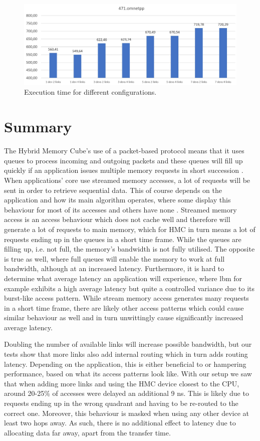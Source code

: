\begin{figure}[!ht]
    \centering
    \includegraphics[width=1.0\linewidth]{figure/471-exectime.jpg}
    \caption{Execution time for different configurations.}
    \label{Memory-access-471-exectime}
\end{figure}

\section{Summary}
The Hybrid Memory Cube's use of a packet-based protocol means that it uses queues to process incoming and outgoing packets and these queues will fill up quickly if an application issues multiple memory requests in short succession \cite{8366939}. When applications' core use streamed memory accesses, a lot of requests will be sent in order to retrieve sequential data. This of course depends on the application and how its main algorithm operates, where some display this behaviour for most of its accesses and others have none \cite{10.1145/3307650.3322229}. Streamed memory access is an access behaviour which does not cache well and therefore will generate a lot of requests to main memory, which for HMC in turn means a lot of requests ending up in the queues in a short time frame. While the queues are filling up, i.e. not full, the memory's bandwidth is not fully utilised. The opposite is true as well, where full queues will enable the memory to work at full bandwidth, although at an increased latency. Furthermore, it is hard to determine what average latency an application will experience, where lbm for example exhibits a high average latency but quite a controlled variance due to its burst-like access pattern. While stream memory access generates many requests in a short time frame, there are likely other access patterns which could cause similar behaviour as well and in turn unwittingly cause significantly increased average latency.
\bigskip

Doubling the number of available links will increase possible bandwidth, but our tests show that more links also add internal routing which in turn adds routing latency. Depending on the application, this is either beneficial to or hampering performance, based on what its access patterns look like. With our setup we saw that when adding more links and using the HMC device closest to the CPU, around 20-25\% of accesses were delayed an additional 9 ns. This is likely due to requests ending up in the wrong quadrant and having to be re-routed to the correct one. Moreover, this behaviour is masked when using any other device at least two hops away. As such, there is no additional effect to latency due to allocating data far away, apart from the transfer time.
\bigskip

